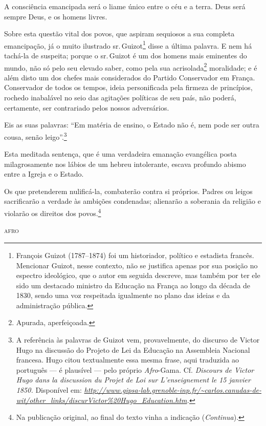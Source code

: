 A consciência emancipada será o liame único entre o céu e a terra. Deus
será sempre Deus, e os homens livres.

Sobre esta questão vital dos povos, que aspiram sequiosos a sua completa
emancipação, já o muito ilustrado sr.\,Guizot\footnote{François Guizot
  (1787--1874) foi um historiador, político e estadista francês.
  Mencionar Guizot, nesse contexto, não se justifica apenas por sua
  posição no espectro ideológico, que o autor em seguida descreve, mas
  também por ter ele sido um destacado ministro da Educação na França ao
  longo da década de 1830, sendo uma voz respeitada igualmente no plano
  das ideias e da administração pública.} disse a última palavra. E nem
há tachá-la de suspeita; porque o sr.\,Guizot é um dos homens mais
eminentes do mundo, não só pelo seu elevado saber, como pela sua
acrisolada\footnote{Apurada, aperfeiçoada.} moralidade; e é além disto
um dos chefes mais considerados do Partido Conservador em França.
Conservador de todos os tempos, ideia personificada pela firmeza de
princípios, rochedo inabalável no seio das agitações políticas de seu
país, não poderá, certamente, ser contrariado pelos nossos adversários.

Eis as suas palavras: ``Em matéria de ensino, o Estado não é, nem pode
ser outra cousa, senão leigo''.\footnote{A referência às palavras de
  Guizot vem, provavelmente, do discurso de Victor Hugo na discussão do
  Projeto de Lei da Educação na Assembleia Nacional francesa. Hugo citou
  textualmente essa mesma frase, aqui traduzida ao português --- é
  plausível --- pelo próprio \emph{Afro}-Gama. Cf. \emph{Discours de
  Victor Hugo dans la discussion du Projet de Loi sur L'enseignement le
  15 janvier 1850.} Disponível em:
  \emph{\url{http://www.gipsa-lab.grenoble-inp.fr/~carlos.canudas-de-wit/other_links/discurVictor\%20Hugo_Education.htm}.}}

Esta meditada sentença, que é uma verdadeira emanação evangélica posta
milagrosamente nos lábios de um hebreu intolerante, escava profundo
abismo entre a Igreja e o Estado.

Os que pretenderem nulificá-la, combaterão contra si próprios. Padres ou
leigos sacrificarão a verdade às ambições condenadas; alienarão a
soberania da religião e violarão os direitos dos povos.\footnote{Na publicação original, ao final do texto vinha a indicação (\emph{Continua}).}

\begin{flushright}
\textsc{afro}
\end{flushright}


